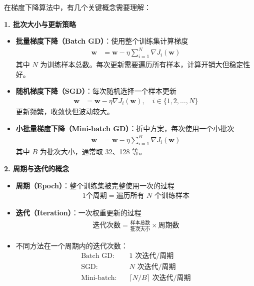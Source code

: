 \begin{example}[梯度下降算法中的批次与周期概念]
在梯度下降算法中，有几个关键概念需要理解：

\textbf{1. 批次大小与更新策略}
\begin{itemize}
\item \textbf{批量梯度下降（Batch GD）}：使用整个训练集计算梯度
  \begin{align}
  \boldsymbol{w} &= \boldsymbol{w} - \eta \sum_{i=1}^{N} \nabla J_i(\boldsymbol{w})
  \end{align}
  其中 $N$ 为训练样本总数。每次更新需要遍历所有样本，计算开销大但稳定性好。

\item \textbf{随机梯度下降（SGD）}：每次随机选择一个样本更新
  \begin{align}
  \boldsymbol{w} &= \boldsymbol{w} - \eta \nabla J_i(\boldsymbol{w}), \quad i \in \{1,2,\ldots,N\}
  \end{align}
  更新频繁，收敛快但波动较大。

\item \textbf{小批量梯度下降（Mini-batch GD）}：折中方案，每次使用一个小批次
  \begin{align}
  \boldsymbol{w} &= \boldsymbol{w} - \eta \sum_{i=1}^{B} \nabla J_i(\boldsymbol{w})
  \end{align}
  其中 $B$ 为批次大小，通常取 32、128 等。
\end{itemize}

\textbf{2. 周期与迭代的概念}
\begin{itemize}
\item \textbf{周期（Epoch）}：整个训练集被完整使用一次的过程
  \begin{align}
  \text{1个周期} = \text{遍历所有 } N \text{ 个训练样本}
  \end{align}

\item \textbf{迭代（Iteration）}：一次权重更新的过程
  \begin{align}
  \text{迭代次数} = \frac{\text{样本总数}}{\text{批次大小}} \times \text{周期数}
  \end{align}

\item 不同方法在一个周期内的迭代次数：
  \begin{align}
  \text{Batch GD:} & \quad 1 \text{ 次迭代/周期} \\
  \text{SGD:} & \quad N \text{ 次迭代/周期} \\
  \text{Mini-batch:} & \quad \lceil N/B \rceil \text{ 次迭代/周期}
  \end{align}
\end{itemize}


\end{example}
